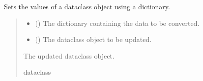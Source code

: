 \documentclass[a4paper,11pt,english,openany]{sphinxmanual}
\begin{document}
\begin{fulllineitems}
\label{\detokenize{api/spyice.utils.helpers:spyice.utils.helpers.set_dataclass}}
\pysigstartsignatures
{}
\pysigstopsignatures
\sphinxAtStartPar
Sets the values of a dataclass object using a dictionary.
\begin{quote}\begin{description}
\begin{itemize}
\item {} 
\sphinxAtStartPar
{} () \textendash{} The dictionary containing the data to be converted.

\item {} 
\sphinxAtStartPar
{} () \textendash{} The dataclass object to be updated.

\end{itemize}

\sphinxAtStartPar
The updated dataclass object.

\sphinxAtStartPar
dataclass

\end{description}\end{quote}

\end{fulllineitems}

\end{document}
